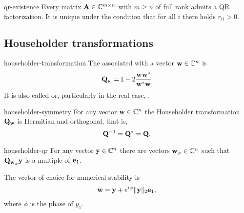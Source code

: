 \begin{Theorem}{qr-existence}
  Every matrix $\mathbf A\in\mathbb C^{m\times n}$ with $m\ge n$ of full rank
  admits a QR factorization. It is unique under the condition that for
  all $i$ there holds $r_{ii} > 0$.
\end{Theorem}

\subsection{Householder transformations}

\begin{Definition}{householder-transformation}
  The 
  associated with a vector $\mathbf w\in\mathbb C^n$ is
  \begin{gather}
    \mathbf Q_w = \mathbb I - 2\frac{\mathbf w\mathbf w^*}{\mathbf w^*\mathbf w}
  \end{gather}
  It is also called  or, particularly in
  the real case, .
\end{Definition}

\begin{Lemma}{householder-symmetry}
  For any vector $\mathbf w\in\mathbb C^n$ the Householder transformation
  $\mathbf Q_{\mathbf w}$ is Hermitian and orthogonal, that is,
  \begin{gather}
    \mathbf Q^{-1} = \mathbf Q^* = \mathbf Q.
  \end{gather}
\end{Lemma}

\begin{Lemma}{householder-qr}
  For any vector $\mathbf y\in\mathbb C^n$ there are vectors $\mathbf w_\varphi\in\mathbb C^n$ such
  that $\mathbf Q_{\mathbf w_\varphi} \mathbf y$ is a multiple of $\mathbf e_1$.

  The vector of choice for numerical stability is
  \begin{gather}
    \mathbf w = \mathbf y + e^{i\varphi} \lVert\mathbf y\rVert_2\mathbf e_1,
  \end{gather}
  where $\phi$ is the phase of $y_1$.
\end{Lemma}

